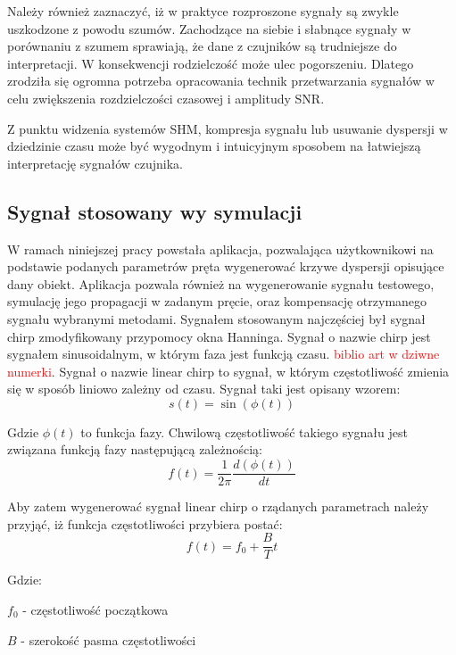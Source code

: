 Należy również zaznaczyć, iż w praktyce rozproszone sygnały są zwykle uszkodzone z powodu szumów. Zachodzące na siebie i słabnące sygnały w porównaniu z szumem sprawiają, że dane z czujników są trudniejsze do interpretacji. W konsekwencji rodzielczość może ulec pogorszeniu. Dlatego zrodziła się ogromna potrzeba opracowania technik przetwarzania sygnałów w celu zwiększenia rozdzielczości czasowej i amplitudy SNR.

Z punktu widzenia systemów SHM, kompresja sygnału lub usuwanie dyspersji w dziedzinie czasu może być wygodnym i intuicyjnym sposobem na łatwiejszą interpretację sygnałów czujnika.

\subsection{Sygnał stosowany wy symulacji}
W ramach niniejszej pracy powstała aplikacja, pozwalająca użytkownikowi na podstawie podanych parametrów pręta wygenerować krzywe dyspersji opisujące dany obiekt. Aplikacja pozwala również na wygenerowanie sygnału testowego, symulację jego propagacji w zadanym pręcie, oraz kompensację otrzymanego sygnału wybranymi metodami. Sygnałem stosowanym najczęściej był sygnał chirp zmodyfikowany przypomocy okna Hanninga.
	Sygnał o nazwie chirp jest sygnałem sinusoidalnym, w którym faza jest funkcją czasu. \textcolor{red}{biblio art w dziwne numerki}. Sygnał o nazwie linear chirp to sygnał, w którym częstotliwość zmienia się w sposób liniowo zależny od czasu. Sygnał taki jest opisany wzorem:
	\begin{equation}
	s(t) = \sin(\phi (t))
	\end{equation}
	
	Gdzie $\phi (t)$ to funkcja fazy. Chwilową częstotliwość takiego sygnału jest związana funkcją fazy następującą zależnością:
	\begin{equation}
	f(t) = \frac{1}{2\pi}\frac{d(\phi (t))}{dt} \label{eq:f(t)_z_phi}
	\end{equation}
	
	Aby zatem wygenerować sygnał linear chirp o rządanych parametrach należy przyjąć, iż funkcja częstotliwości przybiera postać:
	\begin{equation}
	f(t) = f_0+\frac{B}{T}t \label{eq:f(t)_liniowo}
	\end{equation}
	
	Gdzie:
	
	$f_0$ - częstotliwość początkowa
	
	$B$ - szerokość pasma częstotliwości
	
